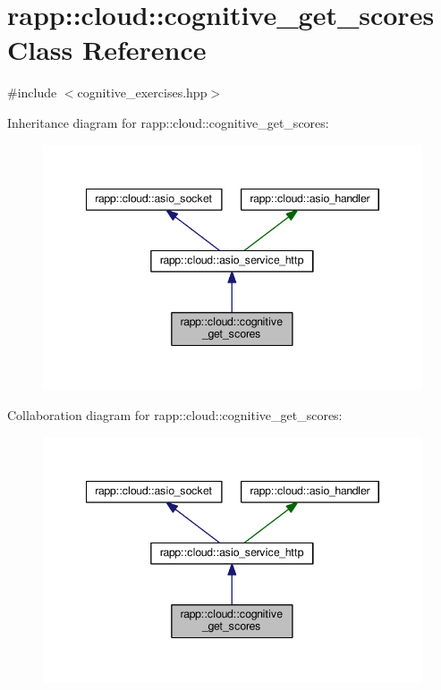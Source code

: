 \hypertarget{classrapp_1_1cloud_1_1cognitive__get__scores}{\section{rapp\-:\-:cloud\-:\-:cognitive\-\_\-get\-\_\-scores Class Reference}
\label{classrapp_1_1cloud_1_1cognitive__get__scores}
}


{\ttfamily \#include $<$cognitive\-\_\-exercises.\-hpp$>$}



Inheritance diagram for rapp\-:\-:cloud\-:\-:cognitive\-\_\-get\-\_\-scores\-:
\nopagebreak
\begin{figure}[H]
\begin{center}
\leavevmode
\includegraphics[width=345pt]{classrapp_1_1cloud_1_1cognitive__get__scores__inherit__graph}
\end{center}
\end{figure}


Collaboration diagram for rapp\-:\-:cloud\-:\-:cognitive\-\_\-get\-\_\-scores\-:
\nopagebreak
\begin{figure}[H]
\begin{center}
\leavevmode
\includegraphics[width=345pt]{classrapp_1_1cloud_1_1cognitive__get__scores__coll__graph}
\end{center}
\end{figure}
